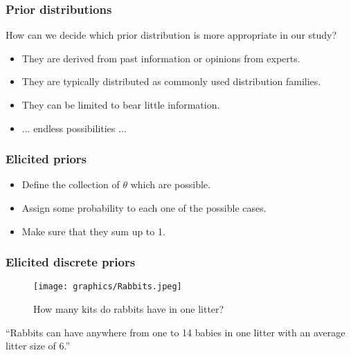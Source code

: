 \documentclass{beamer}
\newcommand{\1}{\ensuremath{\mathbf{1}}}
\begin{document}
%
%
%
\begin{frame}\frametitle{Prior distributions}
	How can we decide which prior distribution is more appropriate in our study?
	\begin{itemize}
		\item They are derived from past information or opinions from experts.
		\item They are typically distributed as commonly used distribution families.
		\item They can be limited to bear little information.
		\item ... endless possibilities ...
	\end{itemize}
\end{frame}
%
%
%
\begin{frame}\frametitle{Elicited priors}
	\begin{block}{}
		\begin{itemize}
			\item Define the collection of $\theta$ which are possible.
			\item Assign some probability to each one of the possible cases.
			\item Make sure that they sum up to 1.
		\end{itemize}
	\end{block}
\end{frame}
%
%
%
\begin{frame}\frametitle{Elicited \textbf{discrete} priors}
	\begin{figure}
	\begin{center}
		\texttt{[image: graphics/Rabbits.jpeg]}
	\end{center}
	\caption{How many kits do rabbits have in one litter?}
	\end{figure}
	\vspace{-3.5ex}\begin{block}{}
	``Rabbits can have anywhere from one to 14 babies in one litter with an average litter size of 6.''
	\end{block}
\end{frame}
\end{document}

